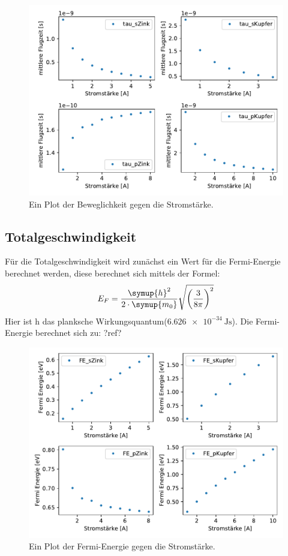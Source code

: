     \begin{figure}[H]
        \centering
        \includegraphics[width=1.1\textwidth]{build/tau.pdf}
        \caption{Ein Plot der Beweglichkeit gegen die Stromstärke.}
        \label{img:Beweg}
    \end{figure}


    \subsection{Totalgeschwindigkeit}


    Für die Totalgeschwindigkeit wird zunächst ein Wert für die Fermi-Energie berechnet werden, diese berechnet sich mittels der Formel:
    \begin{equation}
        E_F = \frac{\symup{h}^2}{2 \cdot \symup{m_0}}\sqrt{\left(\frac{3}{8\pi}\right)^2}
    \end{equation}
    Hier ist h das planksche Wirkungsquantum($\SI{6.626e-34}{\joule\second}$).
    Die Fermi-Energie berechnet sich zu: ?ref?

    \begin{figure}[H]
        \centering
        \includegraphics[width=1.1\textwidth]{build/Fermi.pdf}
        \caption{Ein Plot der Fermi-Energie gegen die Stromstärke.}
        \label{img:FE}
    \end{figure}

